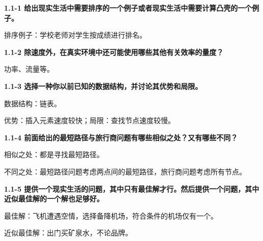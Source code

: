 \documentclass[
]{article}
\author{}
\date{}
\begin{document}
\textbf{1.1-1
给出现实生活中需要排序的一个例子或者现实生活中需要计算凸壳的一个例子。}

排序例子：学校老师对学生按成绩进行排名。

\textbf{1.1-2 除速度外，在真实环境中还可能使用哪些其他有关效率的量度？}

功率、流量等。

\textbf{1.1-3 选择一种你以前已知的数据结构，并讨论其优势和局限。}

数据结构：链表。

优势：插入元素速度较快；局限：查找节点速度较慢。

\textbf{1.1-4
前面给出的最短路径与旅行商问题有哪些相似之处？又有哪些不同？}

相似之处：都是寻找最短路径。

不同之处：最短路径问题考虑两点间的最短路径，旅行商问题考虑所有节点。

\textbf{1.1-5
提供一个现实生活的问题，其中只有最佳解才行。然后提供一个问题，其中近似最佳解的一个解也足够好。}

最佳解：飞机遭遇空情，选择备降机场，符合条件的机场仅有一个。

近似最佳解：出门买矿泉水，不论品牌。
\end{document}

